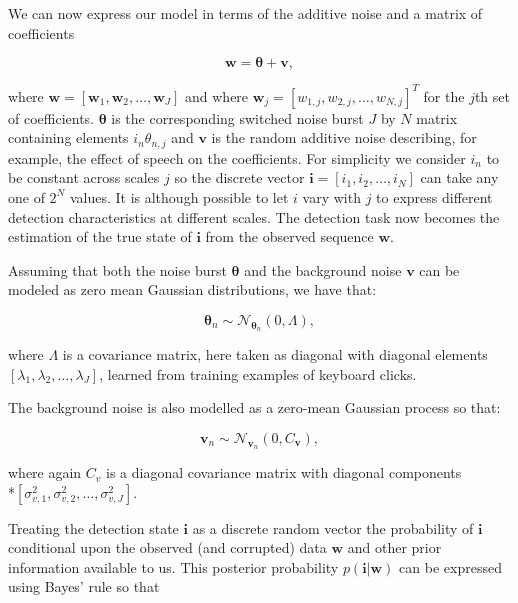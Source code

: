 We can now express our model in terms of the additive noise and a matrix of coefficients

\begin{equation}\label{eq:model2}
\boldsymbol{w} = \boldsymbol{\theta} + \boldsymbol{v},
\end{equation}

where $\boldsymbol{w} = [\boldsymbol{w}_1,\boldsymbol{w}_2,\ldots,\boldsymbol{w}_J]$ and where $\boldsymbol{w}_j = [w_{1,j}, w_{2,j}, \ldots, w_{N,j}]^T$ for the $j$th set of coefficients. $\boldsymbol{\theta}$ is the corresponding switched noise burst $J$ by $N$ matrix containing elements $i_{n}\theta_{n,j}$ and $\boldsymbol{v}$ is the random additive noise describing, for example, the effect of speech on the coefficients. For simplicity we consider $i_{n}$ to be constant across scales $j$ so the discrete vector $\boldsymbol{i} = [i_{1}, i_{2}, \ldots, i_{N}]$ can take any one of $2^{N}$ values. It is although possible to let $i$ vary with $j$ to express different detection characteristics at different scales. The detection task now becomes the estimation of the true state of $\boldsymbol{i}$ from the observed sequence $\boldsymbol{w}$.

Assuming that both the noise burst $\boldsymbol{\theta}$ and the background noise $\boldsymbol{v}$ can be modeled as zero mean Gaussian distributions, we have that:

\begin{equation}\label{eq:burst}
\boldsymbol{\theta}_n \sim \mathcal{N}_{\boldsymbol{\theta}_n}(0,\Lambda),
\end{equation}

where $\Lambda$ is a covariance matrix, here taken as diagonal with diagonal elements $\left[\lambda_{1}, \lambda_{2}, \ldots, \lambda_{J}\right]$, learned from training examples of keyboard clicks.

The background noise is also modelled as a zero-mean Gaussian process so that:

\begin{equation}\label{eq:noise}
\boldsymbol{v}_n \sim \mathcal{N}_{\boldsymbol{v}_n}(0,C_{\boldsymbol{v}}),
\end{equation}

where again $C_v$ is a diagonal covariance matrix with diagonal components \\*$[\sigma_{v,1}^2, \sigma_{v,2}^2, \ldots, \sigma_{v,J}^2]$.

Treating the detection state $\boldsymbol{i}$ as a discrete random vector the probability of $\boldsymbol{i}$ conditional upon the observed (and corrupted) data $\boldsymbol{w}$ and other prior information available to us. This posterior probability $p(\boldsymbol{i}|\boldsymbol{w})$ can be expressed using Bayes' rule so that

